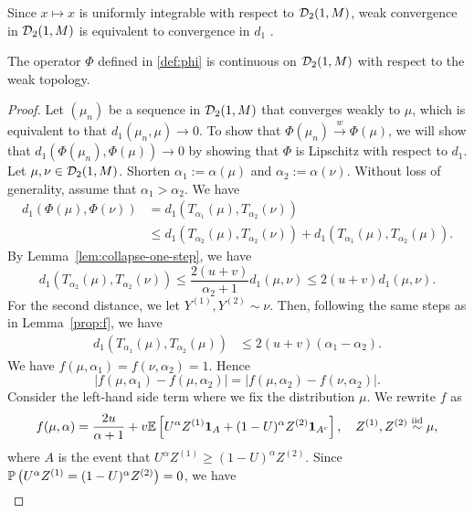 \begin{remark}
  Since $x\mapsto x$ is uniformly integrable with respect to $\mathcal{D}_2(1, M)$, weak convergence in $\mathcal{D}_2(1, M)$ is equivalent to convergence in $d_1$ \cite[Theorem 6.9]{villani2009optimal}.
\end{remark}

\begin{lemma}
  \label{lem:continuity}
  The operator $\Phi$ defined in \ref{def:phi} is continuous on $\mathcal{D}_2(1, M)$ with respect to the weak topology.
\end{lemma}

\begin{proof}
  Let $(\mu_n)$ be a sequence in $\mathcal{D}_2(1, M)$ that converges weakly to $\mu$, which is equivalent to that $d_1(\mu_n, \mu) \to 0$. To show that $\Phi(\mu_n)\stackrel{w}{\longrightarrow}\Phi(\mu)$, we will show that $d_1(\Phi(\mu_n), \Phi(\mu)) \to 0$ by showing that $\Phi$ is Lipschitz with respect to $d_1$. Let $\mu, \nu \in \mathcal{D}_2(1, M)$. Shorten $\alpha_1 := \alpha(\mu)$ and $\alpha_2 := \alpha(\nu)$. Without loss of generality, assume that $\alpha_1 > \alpha_2$. We have
  \begin{align*}
    d_1(\Phi(\mu), \Phi(\nu))
     & = d_1(T_{\alpha_1}(\mu), T_{\alpha_2}(\nu))                                                \\
     & \le d_1(T_{\alpha_2}(\mu), T_{\alpha_2}(\nu)) + d_1(T_{\alpha_1}(\mu), T_{\alpha_2}(\mu)).
  \end{align*}
  By Lemma~\ref{lem:collapse-one-step}, we have
  $$d_1(T_{\alpha_2}(\mu), T_{\alpha_2}(\nu)) \le \dfrac{2(u+v)}{\alpha_2+1}d_1(\mu, \nu) \le 2(u+v) d_1(\mu, \nu).$$
  For the second distance, we let $Y^{(1)},Y^{(2)} \sim \nu$.  Then, following the same steps as in Lemma~\ref{prop:f}, we have
  \begin{align*}
    d_1(T_{\alpha_1}(\mu), T_{\alpha_2}(\mu))
     & \le 2(u+v)(\alpha_1 - \alpha_2).
  \end{align*}
  We have $f(\mu, \alpha_1) = f(\nu, \alpha_2) = 1$. Hence
  $$|f(\mu, \alpha_1) - f(\mu, \alpha_2)| = |f(\mu, \alpha_2) - f(\nu, \alpha_2)|.$$
  Consider the left-hand side term where we fix the distribution $\mu$. We rewrite $f$ as
  $$f(\mu, \alpha) = \dfrac{2u}{\alpha+1} + v\mathbb{E}\left[U^\alpha Z^{(1)}\bm{1}_{A} + (1-U)^\alpha Z^{(2)}\bm{1}_{A^c}\right], \quad Z^{(1)}, Z^{(2)} \stackrel{\text{iid}}{\sim} \mu,$$
  where $A$ is the event that $U^\alpha Z^{(1)} \ge (1-U)^\alpha Z^{(2)}$. Since $\mathbb{P}\left(U^\alpha Z^{(1)} = (1-U)^\alpha Z^{(2)}\right) = 0$, we have
  \begin{align*}

\end{align*}
\end{proof}
